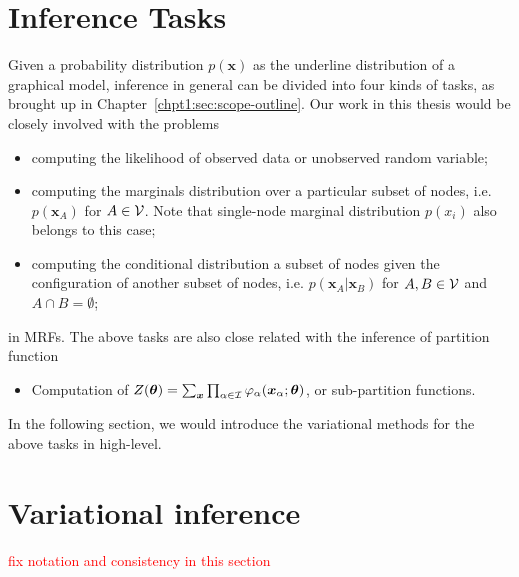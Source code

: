 \section{Inference Tasks}
\label{sec:background-graphial-reppresentation}

Given a probability distribution $p(\bm{x})$ as the underline distribution of a graphical model, inference in general can be divided into four kinds of tasks, as brought up in Chapter~\ref{chpt1:sec:scope-outline}. Our work in this thesis would be closely involved with the problems
\begin{itemize}
\item computing the likelihood of observed data or unobserved random variable;
\item computing the marginals distribution over a particular subset of nodes, i.e. $p(\bm{x}_A)$ for $A \in \mathcal{V}$. Note that single-node marginal distribution $p(x_i)$ also belongs to this case;
\item computing the conditional distribution a subset of nodes given the configuration of another subset of nodes, i.e. $p(\bm{x}_A| \bm{x}_B)$ for $A, B \in \mathcal{V}$ and $A \cap B = \emptyset$;
\end{itemize}
in MRFs. The above tasks are also close related with the inference of partition function
\begin{itemize}
\item Computation of $Z(\bm{\theta}) = \sum_{\bm{x}} \prod_{\alpha \in \mathcal{I}} \varphi_{\alpha}(\bm{x}_{\alpha};\bm{\theta})$, or sub-partition functions.
\end{itemize}

In the following section, we would introduce the variational methods for the above tasks in high-level.


\section{Variational inference}
\textcolor{red}{fix notation and consistency in this section}

